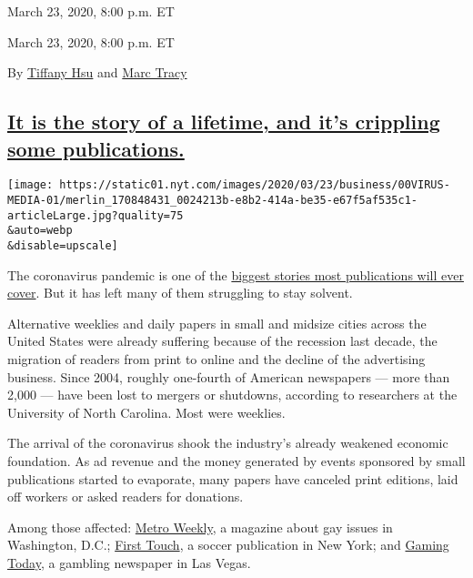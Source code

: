 March 23, 2020, 8:00 p.m. ET

March 23, 2020, 8:00 p.m. ET

By \href{https://www.nytimes.com/by/tiffany-hsu}{Tiffany Hsu} and
\href{https://www.nytimes.com/by/marc-tracy}{Marc Tracy}

\hypertarget{it-is-the-story-of-a-lifetime-and-its-crippling-some-publications}{%
\subsection{\texorpdfstring{\protect\hyperlink{it-is-the-story-of-a-lifetime-and-its-crippling-some-publications}{It
is the story of a lifetime, and it's crippling some
publications.}}{It is the story of a lifetime, and it's crippling some publications.}}\label{it-is-the-story-of-a-lifetime-and-its-crippling-some-publications}}

\texttt{[image: https://static01.nyt.com/images/2020/03/23/business/00VIRUS-MEDIA-01/merlin\_170848431\_0024213b-e8b2-414a-be35-e67f5af535c1-articleLarge.jpg?quality=75\\\&auto=webp\\\&disable=upscale]}

The coronavirus pandemic is one of the
\href{https://www.nytimes.com/2020/03/17/business/media/china-expels-american-journalists.html}{biggest
stories most publications will ever cover}. But it has left many of them
struggling to stay solvent.

Alternative weeklies and daily papers in small and midsize cities across
the United States were already suffering because of the recession last
decade, the migration of readers from print to online and the decline of
the advertising business. Since 2004, roughly one-fourth of American
newspapers --- more than 2,000 --- have been lost to mergers or
shutdowns, according to researchers at the University of North Carolina.
Most were weeklies.

The arrival of the coronavirus shook the industry's already weakened
economic foundation. As ad revenue and the money generated by events
sponsored by small publications started to evaporate, many papers have
canceled print editions, laid off workers or asked readers for
donations.

Among those affected:
\href{https://www.instagram.com/p/B95aZIbBRP3/}{Metro Weekly}, a
magazine about gay issues in Washington, D.C.;
\href{https://www.firsttouchonline.com/first-touch-to-suspend-print-publication-until-april/}{First
Touch}, a soccer publication in New York; and
\href{https://twitter.com/stevecarp56/status/1240307958015078405?s=20}{Gaming
Today}, a gambling newspaper in Las Vegas.

